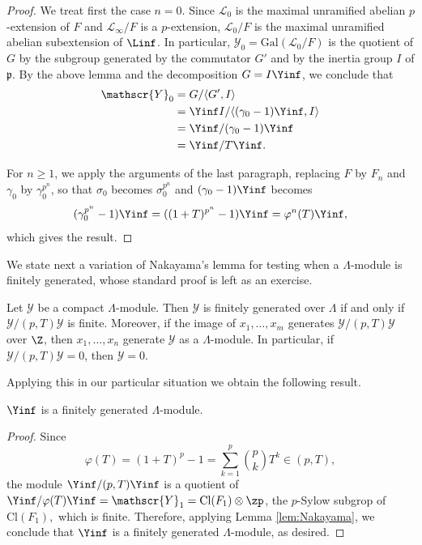 \documentclass[a4paper,10pt, english, reqno]{smfart}
\numberwithin{equation}{section}
\begin{document}
\begin{proof}
We treat first the case $n = 0$. Since $\mathscr{L}_0$ is the maximal unramified abelian $p$-extension of $F$ and $\mathscr{L}_\infty / F$ is a $p$-extension, $\mathscr{L}_0 / F$ is the maximal unramified abelian subextension of $\Linf$. In particular, $\mathscr{Y}_0 = \mathrm{Gal}(\mathscr{L}_0 / F)$ is the quotient of $G$ by the subgroup generated by the commutator $G'$ and by the inertia group $I$ of $\mathfrak{p}$. By the above lemma and the decomposition $G = I \Yinf$, we conclude that 
\begin{align*} \mathscr{Y}_0 &= G / \langle G', I \rangle \\
&= \Yinf I / \langle (\gamma_0 - 1) \Yinf, I \rangle \\
&= \Yinf / (\gamma_0 - 1) \Yinf \\
&= \Yinf / T \Yinf. 
\end{align*}

For $n \geq 1$, we apply the arguments of the last paragraph, replacing $F$ by $F_n$ and $\gamma_0$ by $\gamma_0^{p^n}$, so that $\sigma_0$ becomes $\sigma_0^{p^n}$ and $(\gamma_0 - 1) \Yinf$ becomes 
\[(\gamma_0^{p^n} - 1) \Yinf = ((1 + T)^{p^n} - 1) \Yinf = \varphi^n(T) \Yinf,\]
which gives the result.
\end{proof}

We state next a variation of Nakayama's lemma for testing when a $\Lambda$-module is finitely generated, whose standard proof is left as an exercise.

\begin{lemma} 
Let $\mathscr{Y}$ be a compact $\Lambda$-module. Then $\mathscr{Y}$ is finitely generated over $\Lambda$ if and only if $\mathscr{Y} / (p, T) \mathscr{Y}$ is finite. Moreover, if the image of $x_1, \hdots, x_m$ generates $\mathscr{Y} / (p, T) \mathscr{Y}$ over $\Z$, then $x_1, \hdots, x_n$ generate $\mathscr{Y}$ as a $\Lambda$-module. In particular, if $\mathscr{Y} / (p, T) \mathscr{Y} = 0$, then $\mathscr{Y} = 0$.
\label{lem:Nakayama}
\end{lemma}

Applying this in our particular situation we obtain the following result.
 
\begin{proposition} \label{prop:Iwmu3}
$\Yinf$ is a finitely generated $\Lambda$-module.
\end{proposition}

\begin{proof}
Since 
\[\varphi(T) = (1 + T)^p - 1 = \sum_{k = 1}^p {p \choose k} T^k \in (p, T),\]
the module $\Yinf / (p, T) \Yinf$ is a quotient of $\Yinf / \varphi(T) \Yinf = \mathscr{Y}_1 = \mathrm{Cl}(F_1) \otimes \zp$, the $p$-Sylow subgrop of $\mathrm{Cl}(F_1),$ which is finite. Therefore, applying Lemma \ref{lem:Nakayama}, we conclude that $\Yinf$ is a finitely generated $\Lambda$-module, as desired.
\end{proof}
\end{document}
